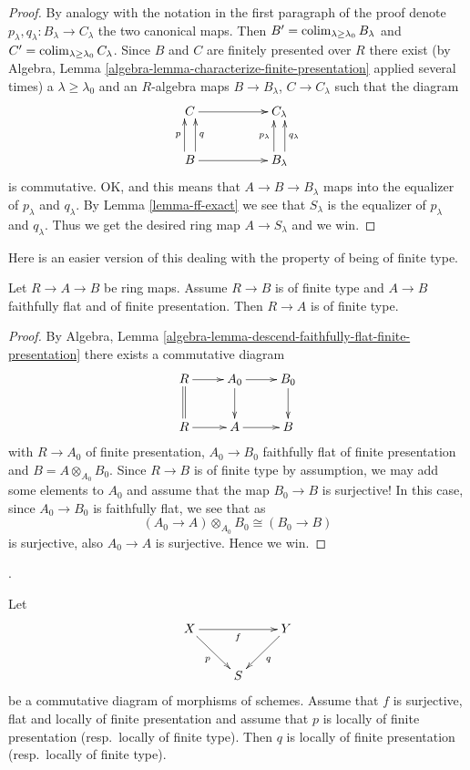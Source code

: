 \begin{proof}
\medskip\noindent
By analogy with the notation in the first paragraph of the proof denote
$p_\lambda, q_\lambda : B_\lambda \to C_\lambda$ the two canonical maps.
Then $B' = \mathop{\mathrm{colim}}\nolimits_{\lambda \geq \lambda_0} B_\lambda$
and $C' = \mathop{\mathrm{colim}}\nolimits_{\lambda \geq \lambda_0} C_\lambda$.
Since $B$ and $C$ are finitely presented over $R$ there exist
(by Algebra, Lemma \ref{algebra-lemma-characterize-finite-presentation}
applied several times)
a $\lambda \geq \lambda_0$ and an $R$-algebra maps
$B \to B_\lambda$, $C \to C_\lambda$ such that
the diagram
$$
\xymatrix{
C \ar[rr] & &
C_\lambda \\
B \ar[rr]
\ar@<1ex>[u]^-p
\ar@<-1ex>[u]_-q
& &
B_\lambda
\ar@<1ex>[u]^-{p_\lambda}
\ar@<-1ex>[u]_-{q_\lambda}
}
$$
is commutative. OK, and this means that $A \to B \to B_\lambda$
maps into the equalizer of $p_\lambda$ and $q_\lambda$.
By Lemma \ref{lemma-ff-exact} we
see that $S_\lambda$ is the equalizer of $p_\lambda$ and $q_\lambda$.
Thus we get the desired ring map $A \to S_\lambda$ and we win.
\end{proof}

\noindent
Here is an easier version of this dealing with the property
of being of finite type.

\begin{lemma}
\label{lemma-finite-type-local-source-fppf-algebra}
Let $R \to A \to B$ be ring maps.
Assume $R \to B$ is of finite type and
$A \to B$ faithfully flat and of finite presentation.
Then $R \to A$ is of finite type.
\end{lemma}

\begin{proof}
By
Algebra, Lemma \ref{algebra-lemma-descend-faithfully-flat-finite-presentation}
there exists a commutative diagram
$$
\xymatrix{
R \ar[r] \ar@{=}[d] &
A_0 \ar[d] \ar[r] &
B_0 \ar[d] \\
R \ar[r] & A \ar[r] & B
}
$$
with $R \to A_0$ of finite presentation,
$A_0 \to B_0$ faithfully flat of finite presentation
and $B = A \otimes_{A_0} B_0$. Since $R \to B$ is of finite
type by assumption, we may add some elements to $A_0$ and assume
that the map $B_0 \to B$ is surjective!
In this case, since $A_0 \to B_0$ is faithfully flat, we see
that as
$$
(A_0 \to A) \otimes_{A_0} B_0 \cong (B_0 \to B)
$$
is surjective, also $A_0 \to A$ is surjective. Hence we win.
\end{proof}

\begin{lemma}
\label{lemma-flat-finitely-presented-permanence}
\begin{reference}
\cite[IV, 17.7.5 (i) and (ii)]{EGA}.
\end{reference}
Let
$$
\xymatrix{
X \ar[rr]_f \ar[rd]_p & &
Y \ar[dl]^q \\
& S
}
$$
be a commutative diagram of morphisms of schemes. Assume that $f$ is
surjective, flat and locally of finite presentation and assume
that $p$ is locally of finite presentation (resp.\ locally of finite type).
Then $q$ is locally of finite presentation (resp.\ locally of finite type).
\end{lemma}

